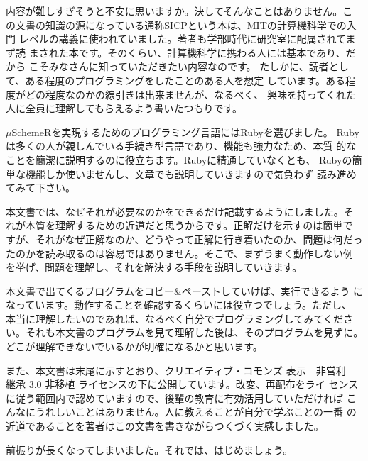 内容が難しすぎそうと不安に思いますか。決してそんなことはありません。こ
の文書の知識の源になっている通称SICPという本は、MITの計算機科学での入門
レベルの講義に使われていました。著者も学部時代に研究室に配属されてまず読
まされた本です。そのくらい、計算機科学に携わる人には基本であり、だから
こそみなさんに知っていただきたい内容なのです。
たしかに、読者として、ある程度のプログラミングをしたことのある人を想定
しています。ある程度がどの程度なのかの線引きは出来ませんが、なるべく、
興味を持ってくれた人に全員に理解してもらえるよう書いたつもりです。

$\mu$SchemeRを実現するためのプログラミング言語にはRubyを選びました。
Rubyは多くの人が親しんでいる手続き型言語であり、機能も強力なため、本質
的なことを簡潔に説明するのに役立ちます。Rubyに精通していなくとも、
Rubyの簡単な機能しか使いませんし、文章でも説明していきますので気負わず
読み進めてみて下さい。

本文書では、なぜそれが必要なのかをできるだけ記載するようにしました。そ
れが本質を理解するための近道だと思うからです。正解だけを示すのは簡単で
すが、それがなぜ正解なのか、どうやって正解に行き着いたのか、問題は何だっ
たのかを読み取るのは容易ではありません。そこで、まずうまく動作しない例
を挙げ、問題を理解し、それを解決する手段を説明していきます。

本文書で出てくるプログラムをコピー$\&$ペーストしていけば、実行できるよう
になっています。動作することを確認するくらいには役立つでしょう。ただし、
本当に理解したいのであれば、なるべく自分でプログラミングしてみてくださ
い。それも本文書のプログラムを見て理解した後は、そのプログラムを見ずに。
どこが理解できないでいるかが明確になるかと思います。

また、本文書は末尾に示すとおり、クリエイティブ・コモンズ 表示 - 非営利
- 継承 3.0 非移植 ライセンスの下に公開しています。改変、再配布をライ
センスに従う範囲内で認めていますので、後輩の教育に有効活用していただければ
こんなにうれしいことはありません。人に教えることが自分で学ぶことの一番
の近道であることを著者はこの文書を書きながらつくづく実感しました。

前振りが長くなってしまいました。それでは、はじめましょう。
